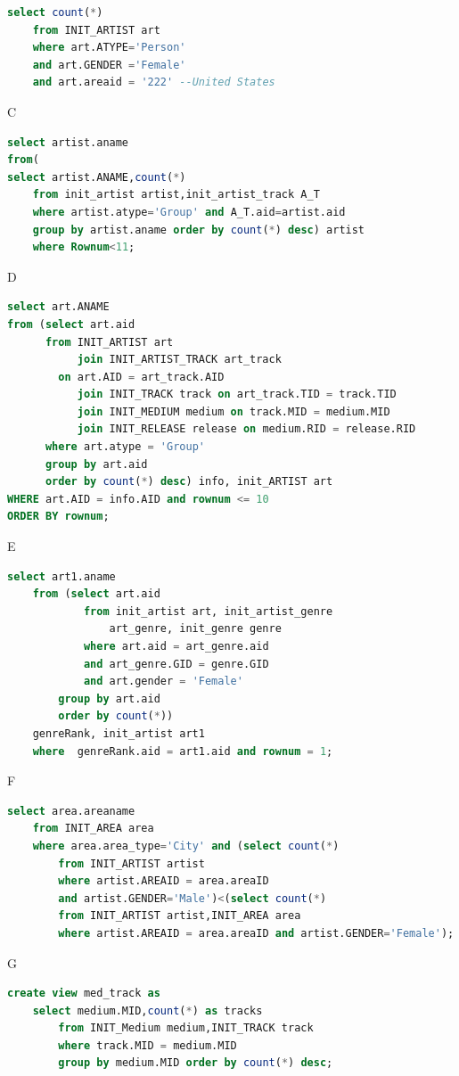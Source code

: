 \documentclass[11pt]{article} %
\begin{document}
{\begin{lstlisting}[language=SQL, keywordstyle=\color{blue!70},
commentstyle=\color{red!50!green!50!blue!50},
rulesepcolor=\color{red!20!green!20!blue!20},
frame=shadowbox]
select count(*)
	from INIT_ARTIST art
	where art.ATYPE='Person'
	and art.GENDER ='Female'
	and art.areaid = '222' --United States
\end{lstlisting}
C
\begin{lstlisting}[language=SQL, keywordstyle=\color{blue!70},
commentstyle=\color{red!50!green!50!blue!50},
rulesepcolor=\color{red!20!green!20!blue!20},
frame=shadowbox]
select artist.aname
from(
select artist.ANAME,count(*)
	from init_artist artist,init_artist_track A_T
	where artist.atype='Group' and A_T.aid=artist.aid
	group by artist.aname order by count(*) desc) artist
	where Rownum<11;
\end{lstlisting}
D
\begin{lstlisting}[language=SQL, keywordstyle=\color{blue!70},
commentstyle=\color{red!50!green!50!blue!50},
rulesepcolor=\color{red!20!green!20!blue!20},
frame=shadowbox]
select art.ANAME
from (select art.aid
      from INIT_ARTIST art 
           join INIT_ARTIST_TRACK art_track
		on art.AID = art_track.AID
           join INIT_TRACK track on art_track.TID = track.TID
           join INIT_MEDIUM medium on track.MID = medium.MID
           join INIT_RELEASE release on medium.RID = release.RID
      where art.atype = 'Group'
      group by art.aid
      order by count(*) desc) info, init_ARTIST art
WHERE art.AID = info.AID and rownum <= 10
ORDER BY rownum;
\end{lstlisting}
E
\begin{lstlisting}[language=SQL, keywordstyle=\color{blue!70},
commentstyle=\color{red!50!green!50!blue!50},
rulesepcolor=\color{red!20!green!20!blue!20},
frame=shadowbox]
select art1.aname
	from (select art.aid
			from init_artist art, init_artist_genre
				art_genre, init_genre genre
			where art.aid = art_genre.aid
			and art_genre.GID = genre.GID
			and art.gender = 'Female' 
		group by art.aid
		order by count(*))
	genreRank, init_artist art1
	where  genreRank.aid = art1.aid and rownum = 1;
\end{lstlisting}
F
\begin{lstlisting}[language=SQL, keywordstyle=\color{blue!70},
commentstyle=\color{red!50!green!50!blue!50},
rulesepcolor=\color{red!20!green!20!blue!20},
frame=shadowbox]
select area.areaname
	from INIT_AREA area
	where area.area_type='City' and (select count(*)
		from INIT_ARTIST artist
		where artist.AREAID = area.areaID
		and artist.GENDER='Male')<(select count(*)
		from INIT_ARTIST artist,INIT_AREA area
		where artist.AREAID = area.areaID and artist.GENDER='Female');
\end{lstlisting}
G
\begin{lstlisting}[language=SQL, keywordstyle=\color{blue!70},
commentstyle=\color{red!50!green!50!blue!50},
rulesepcolor=\color{red!20!green!20!blue!20},
frame=shadowbox]
create view med_track as
	select medium.MID,count(*) as tracks
		from INIT_Medium medium,INIT_TRACK track
		where track.MID = medium.MID
		group by medium.MID order by count(*) desc;


\end{lstlisting}}
\end{document}
